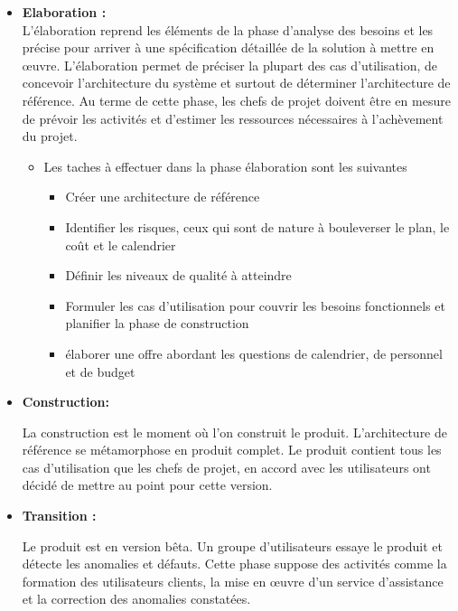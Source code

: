 \documentclass[12 pt ]{report}
\begin{document}
\begin{itemize}[font=\color{black} \Large, label=]
\item \textbf{Elaboration :}
\\

L'élaboration reprend les éléments de la phase d'analyse des besoins et les précise pour arriver à une spécification détaillée de la solution à mettre en œuvre. L'élaboration permet de préciser la plupart des cas d’utilisation, de concevoir l’architecture du système et surtout de déterminer l'architecture de référence. Au terme de cette phase, les chefs de projet doivent être en mesure de prévoir les activités et d’estimer les ressources nécessaires à l’achèvement du projet.
\begin{itemize}[font=\color{black} \Large, label=]
\item Les taches à effectuer dans la phase élaboration sont les suivantes \begin{itemize}[font=\color{black} \Large, label=]
\item Créer une architecture de référence
\item Identifier les risques, ceux qui sont de nature à bouleverser le plan, le coût et le calendrier
\item Définir les niveaux de qualité à atteindre
\item Formuler les cas d'utilisation pour couvrir les besoins fonctionnels et planifier la phase de construction
\item élaborer une offre abordant les questions de calendrier, de personnel et de budget
\end{itemize}
\end{itemize}
\item \textbf{Construction:} 
\begin{flushleft}
La construction est le moment où l’on construit le produit. L’architecture de référence se métamorphose en produit complet. Le produit contient tous les cas d’utilisation que les chefs de projet, en accord avec les utilisateurs ont décidé de mettre au point pour cette version.
\end{flushleft}
\item \textbf{Transition :} 
\begin{flushleft}
Le produit est en version bêta. Un groupe d’utilisateurs essaye le produit et détecte les anomalies et défauts. Cette phase suppose des activités comme la formation des utilisateurs clients, la mise en œuvre d’un service d’assistance et la correction des anomalies constatées.
\end{flushleft}
\end{itemize}
\newpage
\end{document}
